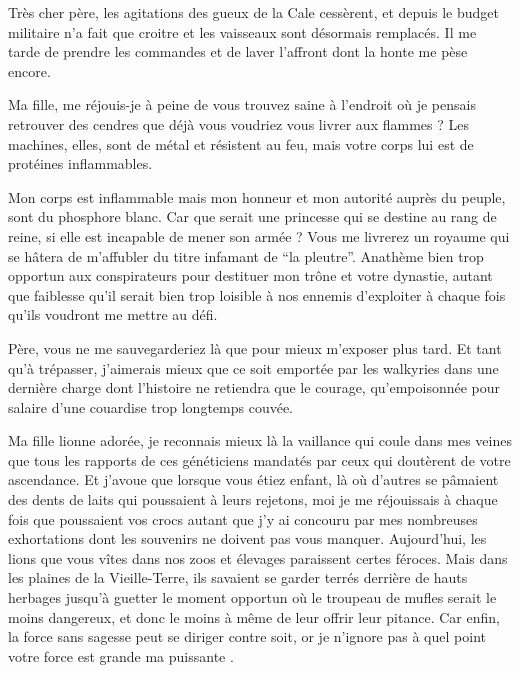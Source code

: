 \scene

\StageDirII{\ela, \roi}




\begin{drama}
  \elaspeaks  Très cher père, les agitations des gueux de la Cale cessèrent, et depuis le budget militaire n’a fait que croitre et les vaisseaux sont désormais remplacés. Il me tarde de prendre les commandes et de laver l’affront dont la honte me pèse encore.

  \roispeaks  Ma fille, me réjouis-je à peine de vous trouvez saine à l’endroit où je pensais retrouver des cendres que déjà vous voudriez vous livrer aux flammes ? Les machines, elles, sont de métal et résistent au feu, mais votre corps lui est de protéines inflammables.

  \elaspeaks Mon corps est inflammable mais mon honneur et mon autorité auprès du peuple, sont du phosphore blanc. Car que serait une princesse qui se destine au rang de reine, si elle est incapable de mener son armée ? Vous me livrerez un royaume qui se hâtera de m’affubler du titre infamant de \enquote{\princesse la pleutre}. Anathème  bien trop opportun aux conspirateurs pour destituer mon trône et votre dynastie, autant que faiblesse qu’il serait bien trop loisible à nos ennemis d’exploiter à chaque fois qu’ils voudront me mettre au défi.

  Père, vous ne me sauvegarderiez là que pour mieux m’exposer plus tard. Et tant qu’à trépasser, j’aimerais mieux que ce soit emportée par les walkyries dans une dernière charge dont l’histoire ne retiendra que le courage, qu’empoisonnée pour salaire d’une couardise trop longtemps  couvée.

  \roispeaks  Ma fille lionne adorée, je reconnais mieux là la vaillance qui coule dans mes veines que tous les rapports de ces généticiens mandatés par ceux qui doutèrent de votre ascendance. Et j’avoue que lorsque vous étiez enfant, là où d’autres se pâmaient des dents de laits qui poussaient à leurs rejetons, moi je me réjouissais à chaque fois que poussaient vos crocs autant que j’y ai concouru par mes nombreuses exhortations dont les souvenirs ne doivent pas vous manquer. Aujourd’hui, les lions que vous vîtes dans nos zoos et élevages paraissent certes féroces. Mais dans les plaines de la Vieille-Terre, ils savaient se garder terrés derrière de hauts herbages jusqu’à guetter le moment opportun où le troupeau de mufles serait le moins dangereux, et donc le moins à même de leur offrir leur pitance. Car enfin, la force sans sagesse peut se diriger contre soit, or je n’ignore pas à quel point votre force est grande ma puissante \princesse{}.


\end{drama}
